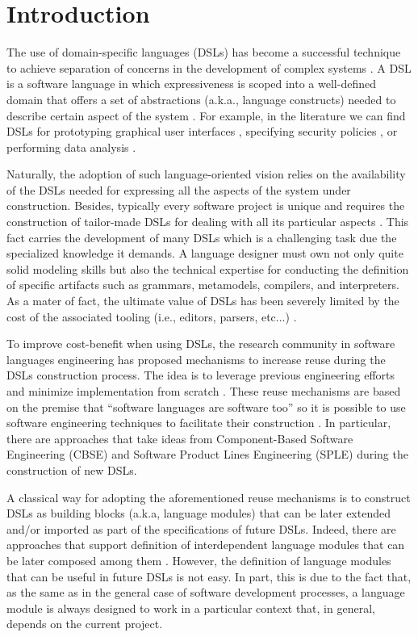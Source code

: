 \section{Introduction}
\label{sec:introduction}

The use of domain-specific languages (DSLs) has become a successful technique to achieve separation of concerns in the development of complex systems \cite{Cook:2006}. A DSL is a software language in which expressiveness is scoped into a well-defined domain that offers a set of abstractions (a.k.a., language constructs) needed to describe certain aspect of the system \cite{Combemale:2014}. For example, in the literature we can find DSLs for prototyping graphical user interfaces \cite{Oney:2012}, specifying security policies \cite{Lodderstedt:2002}, or performing data analysis \cite{Eberius:2012}. 

Naturally, the adoption of such language-oriented vision relies on the availability of the DSLs needed for expressing all the aspects of the system under construction. Besides, typically every software project is unique and requires the construction of tailor-made DSLs for dealing with all its particular aspects \cite{Clark:2013}. This fact carries the development of many DSLs which is a challenging task due the specialized knowledge it demands. A language designer must own not only quite solid modeling skills but also the technical expertise for conducting the definition of specific artifacts such as grammars, metamodels, compilers, and interpreters. As a mater of fact, the ultimate value of DSLs has been severely limited by the cost of the associated tooling (i.e., editors, parsers, etc...) \cite{jezequel:2014}.

To improve cost-benefit when using DSLs, the research community in software languages engineering has proposed mechanisms to increase reuse during the DSLs construction process. The idea is to leverage previous engineering efforts and minimize implementation from scratch \cite{Storm:2013}. These reuse mechanisms are based on the premise that ``software languages are software too'' \cite{Favre:2011} so it is possible to use software engineering techniques to facilitate their construction \cite{Kleppe:2009}. In particular, there are approaches that take ideas from Component-Based Software Engineering (CBSE) \cite{Cleenewerck:2003} and Software Product Lines Engineering (SPLE)  \cite{Zschaler:2010} during the construction of new DSLs.

A classical way for adopting the aforementioned reuse mechanisms is to construct DSLs as building blocks (a.k.a, language modules) that can be later extended and/or imported as part of the specifications of future DSLs. Indeed, there are approaches that support definition of interdependent language modules that can be later composed among them \cite{Vacchi:2015,Mernik:2013,Rumpe:2010}. However, the definition of language modules that can be useful in future DSLs is not easy. In part, this is due to the fact that, as the same as in the general case of software development processes, a language module is always designed to work in a particular context that, in general, depends on the current project. 

